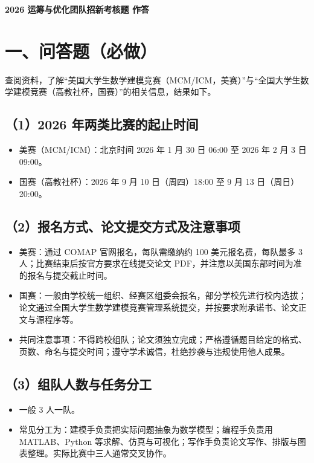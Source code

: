 \documentclass[12pt,a4paper]{ctexart}
\begin{document}
\begin{center}
{\heiti\bfseries 2026 运筹与优化团队招新考核题 作答}\par
\vspace{0.6em}
\end{center}

\section{一、问答题（必做）}

查阅资料，了解“美国大学生数学建模竞赛（MCM/ICM，美赛）”与“全国大学生数学建模竞赛（高教社杯，国赛）”的相关信息，结果如下。

\subsection{（1）2026 年两类比赛的起止时间}
\begin{itemize}
  \item 美赛（MCM/ICM）：北京时间 2026 年 1 月 30 日 06:00 至 2026 年 2 月 3 日 09:00。
  \item 国赛（高教社杯）：2026 年 9 月 10 日（周四）18:00 至 9 月 13 日（周日）20:00。
\end{itemize}

\subsection{（2）报名方式、论文提交方式及注意事项}
\begin{itemize}
  \item 美赛：通过 COMAP 官网报名，每队需缴纳约 100 美元报名费，每队最多 3 人；比赛结束后按官方要求在线提交论文 PDF，并注意以美国东部时间为准的报名与提交截止时间。
  \item 国赛：一般由学校统一组织、经赛区组委会报名，部分学校先进行校内选拔；论文通过全国大学生数学建模竞赛管理系统提交，并按要求附承诺书、论文正文与源程序等。
  \item 共同注意事项：不得跨校组队；论文须独立完成；严格遵循题目给定的格式、页数、命名与提交时间；遵守学术诚信，杜绝抄袭与违规使用他人成果。
\end{itemize}

\subsection{（3）组队人数与任务分工}
\begin{itemize}
  \item 一般 3 人一队。
  \item 常见分工为：建模手负责把实际问题抽象为数学模型；编程手负责用 MATLAB、Python 等求解、仿真与可视化；写作手负责论文写作、排版与图表整理。实际比赛中三人通常交叉协作。
\end{itemize}
\end{document}
